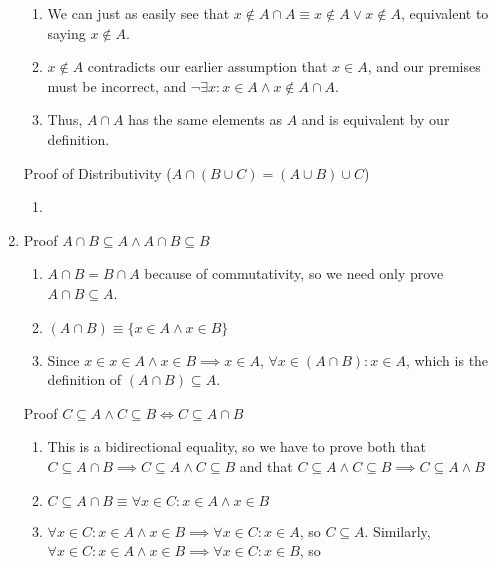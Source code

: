 \documentclass{article}
\begin{document}
\begin{enumerate}
\begin{enumerate}
                \item We can just as easily see that $x \notin A \cap A \equiv
                    x \notin A \lor x \notin A$, equivalent to saying $x \notin
                    A$.
                \item $x \notin A$ contradicts our earlier assumption that $x \in A$, and our
                    premises must be incorrect, and $\neg\exists x : x \in A \land x \notin A \cap A$.
                \item Thus, $A \cap A$ has the same elements as $A$ and is
                    equivalent by our definition.
            \end{enumerate}
            Proof of Distributivity ($A \cap (B \cup C) = (A \cup B) \cup C$)
            \begin{enumerate}
                \item 
            \end{enumerate}
        \item Proof $A \cap B \subseteq A \land A \cap B \subseteq B$
            \begin{enumerate}
                \item $A \cap B = B \cap A$ because of commutativity, so we
                    need only prove $A \cap B \subseteq A$.
                \item $(A \cap B) \equiv \{x \in A \land x \in B\}$
                \item Since $x \in {x \in A \land x \in B} \implies x \in A$,
                    $\forall x \in (A \cap B) : x \in A$, which is the definition
                    of $(A \cap B) \subseteq A$.
            \end{enumerate}
            Proof $C \subseteq A \land C \subseteq B \iff C \subseteq A \cap B$
            \begin{enumerate}
                \item This is a bidirectional equality, so we have to prove both that
                    $C \subseteq A \cap B \implies C \subseteq A \land C \subseteq B$ and
                    that $C \subseteq A \land C \subseteq B \implies C \subseteq A \land B$
                \item $C \subseteq A \cap B \equiv \forall x \in C: x \in A \land x \in B$
                \item $\forall x \in C: x \in A \land x \in B \implies \forall x \in C: x \in A$, so
                    $C \subseteq A$. Similarly, $\forall x \in C: x \in A \land x \in B \implies \forall x \in C: x \in B$, so

\end{enumerate}
\end{enumerate}
\end{document}
